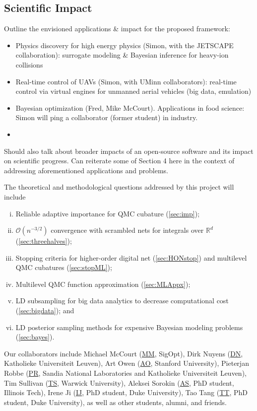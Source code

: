 \documentclass[11pt]{NSFamsart}
\newcommand{\cmtS}[1]{{\color{blue}{(Simon: #1)}}}
\newcommand{\AO}{\hyperlink{AOlink}{AO}\xspace}
\newcommand{\MM}{\hyperlink{MMlink}{MM}\xspace}
\newcommand{\TS}{\hyperlink{TSlink}{TS}\xspace}
\newcommand{\IJi}{\hyperlink{IJlink}{IJ}\xspace}
\newcommand{\TT}{\hyperlink{TTlink}{TT}\xspace}
\newcommand{\AS}{\hyperlink{ASlink}{AS}\xspace}
\newcommand{\PR}{\hyperlink{PRlink}{PR}\xspace}
\newcommand{\DN}{\hyperlink{DNlink}{DN}\xspace}
\newcommand{\reals}{{\mathbb{R}}}
\newcommand{\Order}{\mathcal{O}}
\begin{document}
\subsection{Scientific Impact} Outline the envisioned applications \& impact for the proposed framework:
\begin{itemize}
\item Physics discovery for high energy physics (Simon, with the JETSCAPE collaboration): surrogate modeling \& Bayesian inference for heavy-ion collisions
\item Real-time control of UAVs (Simon, with UMinn collaborators): real-time control via virtual engines for unmanned aerial vehicles (big data, emulation)
\item Bayesian optimization (Fred, Mike McCourt). Applications in food science: Simon will ping a collaborator (former student) in industry.
\item \cmtS{Fred: random coefficients in PDE, for engineering applications.}
\end{itemize}
Should also talk about broader impacts of an open-source software and its impact on scientific progress. Can reiterate some of Section 4 here in the context of addressing aforementioned applications and problems.

The theoretical and methodological questions addressed by this project will include \cmtS{to modify, move later into Section 1? and have this has a one-paragraph abstract on the overarching framework \& broader impacts?}
\begin{enumerate}[i)]
\item Reliable adaptive importance for QMC cubature (\cref{sec:imp});
\item $\Order(n^{-3/2})$ convergence with scrambled nets for integrals over $\reals^d$ (\cref{sec:threehalves});
\item Stopping criteria for higher-order digital net (\cref{sec:HONstop}) and multilevel QMC cubatures (\cref{sec:stopML});
\item Multilevel QMC function approximation (\cref{sec:MLAppx});
\item LD subsampling for big data analytics to decrease computational cost (\cref{sec:bigdata}); and
\item LD posterior sampling methods for expensive Bayesian modeling problems (\cref{sec:bayes}).
\end{enumerate}

Our collaborators include  
\hypertarget{MMlink}{Michael McCourt} (\MM, SigOpt), 
\hypertarget{DNlink}{Dirk Nuyens} (\DN,  Katholieke Universiteit Leuven),
\hypertarget{AOlink}{Art Owen} (\AO, Stanford University), 
\hypertarget{PRlink}{Pieterjan Robbe} (\PR, Sandia National Laboratories and Katholieke Universiteit Leuven),  
\hypertarget{TSlink}{Tim Sullivan} (\TS, Warwick University), 
\hypertarget{ASlink}{Aleksei Sorokin} (\AS, PhD student, Illinois Tech),
\hypertarget{IJlink}{Irene Ji} (\IJi, PhD student, Duke University), 
\hypertarget{TTlink}{Tao Tang} (\TT, PhD student, Duke University), as well as other students, alumni, and friends. \cmtS{to modify}
\end{document}
